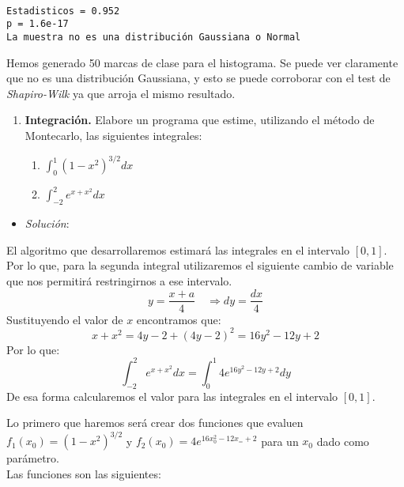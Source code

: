 \documentclass[11pt]{article}
\providecommand{\tightlist}{%
      \setlength{\itemsep}{0pt}\setlength{\parskip}{0pt}}
\begin{document}
    \begin{center}
    \end{center}
    { \hspace*{\fill} \\}
    
    \begin{Verbatim}[commandchars=\\\{\}]
Estadisticos = 0.952
p = 1.6e-17
La muestra no es una distribución Gaussiana o Normal
    \end{Verbatim}

    Hemos generado 50 marcas de clase para el histograma. Se puede ver
claramente que no es una distribución Gaussiana, y esto se puede
corroborar con el test de \emph{Shapiro-Wilk} ya que arroja el mismo
resultado.

    \begin{enumerate}
\def\labelenumi{\arabic{enumi}.}
\setcounter{enumi}{1}
\item
  \textbf{Integración.} Elabore un programa que estime, utilizando el
  método de Montecarlo, las siguientes integrales:

  \begin{enumerate}
  \def\labelenumii{(\alph{enumii})}
  \item
    \(\displaystyle\int_0^1 (1-x^2)^{3/2} dx\)
  \item
    \(\displaystyle\int_{-2}^{2} e^{x+x^2} dx\)
  \end{enumerate}
\end{enumerate}

    \begin{itemize}
\tightlist
\item
  \emph{Solución}:
\end{itemize}

El algoritmo que desarrollaremos estimará las integrales en el intervalo
\([0,1]\). Por lo que, para la segunda integral utilizaremos el
siguiente cambio de variable que nos permitirá restringirnos a ese
intervalo. \[y = \frac{x+a}{4}\quad \Rightarrow dy = \frac{dx}{4}\]
Sustituyendo el valor de \(x\) encontramos que:
\[x+x^2 = 4y -2 +(4y-2)^2 =16y^2-12y+2\] Por lo que:
\[\displaystyle\int_{-2}^{2} e^{x+x^2} dx = \displaystyle\int_{0}^{1} 4e^{16y^2-12y+2} dy\]
De esa forma calcularemos el valor para las integrales en el intervalo
\([0,1]\).

Lo primero que haremos será crear dos funciones que evaluen
\(f_1(x_0) = (1-x^2)^{3/2}\) y \(f_2(x_0)=4e^{16x_0^2-12x_=+2}\) para un
\(x_0\) dado como parámetro.\\
Las funciones son las siguientes:
\end{document}
